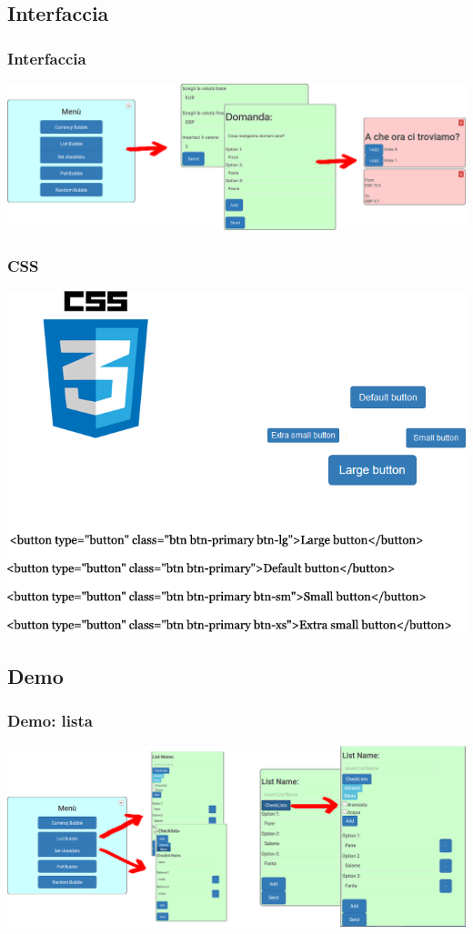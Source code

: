 \subsection{Interfaccia}
\begin{frame}
	\frametitle{Interfaccia}
	\begin{center}
	\includegraphics[scale=0.22]{img/interf.png}
	\end{center}
\end{frame}


\begin{frame}
	\frametitle{CSS}
	\begin{center}
	\includegraphics[scale=0.35]{img/css.png}
	\end{center}
\end{frame}

\subsection{Demo}
\begin{frame}
	\frametitle{Demo: lista}
	\begin{center}
	\includegraphics[scale=0.25]{img/demo.png}
	\end{center}
\end{frame}
